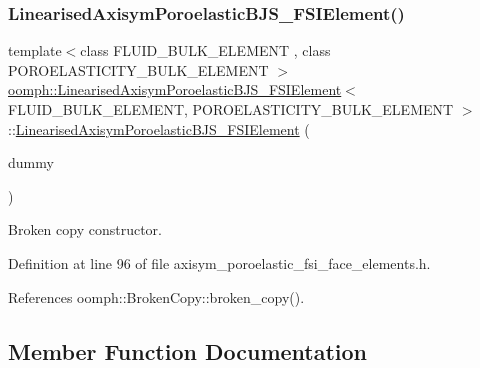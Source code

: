 \subsubsection{\texorpdfstring{Linearised\+Axisym\+Poroelastic\+B\+J\+S\+\_\+\+F\+S\+I\+Element()}{LinearisedAxisymPoroelasticBJS\_FSIElement()}\hspace{0.1cm}{\footnotesize\ttfamily [3/3]}}
{\footnotesize\ttfamily template$<$class F\+L\+U\+I\+D\+\_\+\+B\+U\+L\+K\+\_\+\+E\+L\+E\+M\+E\+NT , class P\+O\+R\+O\+E\+L\+A\+S\+T\+I\+C\+I\+T\+Y\+\_\+\+B\+U\+L\+K\+\_\+\+E\+L\+E\+M\+E\+NT $>$ \\
\hyperlink{classoomph_1_1LinearisedAxisymPoroelasticBJS__FSIElement}{oomph\+::\+Linearised\+Axisym\+Poroelastic\+B\+J\+S\+\_\+\+F\+S\+I\+Element}$<$ F\+L\+U\+I\+D\+\_\+\+B\+U\+L\+K\+\_\+\+E\+L\+E\+M\+E\+NT, P\+O\+R\+O\+E\+L\+A\+S\+T\+I\+C\+I\+T\+Y\+\_\+\+B\+U\+L\+K\+\_\+\+E\+L\+E\+M\+E\+NT $>$\+::\hyperlink{classoomph_1_1LinearisedAxisymPoroelasticBJS__FSIElement}{Linearised\+Axisym\+Poroelastic\+B\+J\+S\+\_\+\+F\+S\+I\+Element} (\begin{DoxyParamCaption}\item[{const \hyperlink{classoomph_1_1LinearisedAxisymPoroelasticBJS__FSIElement}{Linearised\+Axisym\+Poroelastic\+B\+J\+S\+\_\+\+F\+S\+I\+Element}$<$ F\+L\+U\+I\+D\+\_\+\+B\+U\+L\+K\+\_\+\+E\+L\+E\+M\+E\+NT, P\+O\+R\+O\+E\+L\+A\+S\+T\+I\+C\+I\+T\+Y\+\_\+\+B\+U\+L\+K\+\_\+\+E\+L\+E\+M\+E\+NT $>$ \&}]{dummy }\end{DoxyParamCaption})\hspace{0.3cm}{\ttfamily [inline]}}



Broken copy constructor. 



Definition at line 96 of file axisym\+\_\+poroelastic\+\_\+fsi\+\_\+face\+\_\+elements.\+h.



References oomph\+::\+Broken\+Copy\+::broken\+\_\+copy().



\subsection{Member Function Documentation}
\mbox{\label{classoomph_1_1LinearisedAxisymPoroelasticBJS__FSIElement_a698c4c54f4e7419a3562792c0d935c55}} 
